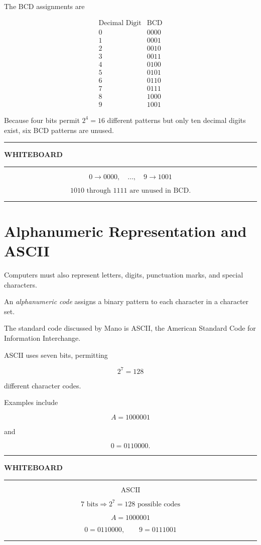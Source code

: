 \documentclass[11pt]{article}
\newenvironment{whiteboard}
{
    \par\medskip
    \begin{center}
    \begin{minipage}{0.94\textwidth}
    \hrule
    \vspace{0.4em}
    \textbf{\large WHITEBOARD}
    \vspace{0.3em}
    \hrule
    \vspace{0.7em}
}
{
    \vspace{0.5em}
    \hrule
    \end{minipage}
    \end{center}
    \medskip
}
\begin{document}
The BCD assignments are

\[
\begin{array}{c|c}
\text{Decimal Digit} & \text{BCD} \\ \hline
0&0000\\
1&0001\\
2&0010\\
3&0011\\
4&0100\\
5&0101\\
6&0110\\
7&0111\\
8&1000\\
9&1001
\end{array}
\]

Because four bits permit \(2^4=16\) different patterns but only ten decimal
digits exist, six BCD patterns are unused.

\begin{whiteboard}
\[
0\rightarrow0000,\quad\ldots,\quad9\rightarrow1001
\]

\[
\boxed{1010\text{ through }1111\text{ are unused in BCD.}}
\]
\end{whiteboard}

\section{Alphanumeric Representation and ASCII}

Computers must also represent letters, digits, punctuation marks, and special
characters.

An \emph{alphanumeric code} assigns a binary pattern to each character in a
character set.

The standard code discussed by Mano is ASCII, the American Standard Code
for Information Interchange.

ASCII uses seven bits, permitting

\[
2^7=128
\]

different character codes.

Examples include

\[
A=1000001
\]

and

\[
0=0110000.
\]

\begin{whiteboard}
\[
\boxed{\text{ASCII}}
\]

\[
7\text{ bits}\Rightarrow2^7=128\text{ possible codes}
\]

\[
A=1000001
\]

\[
0=0110000,\qquad9=0111001
\]
\end{whiteboard}
\end{document}
